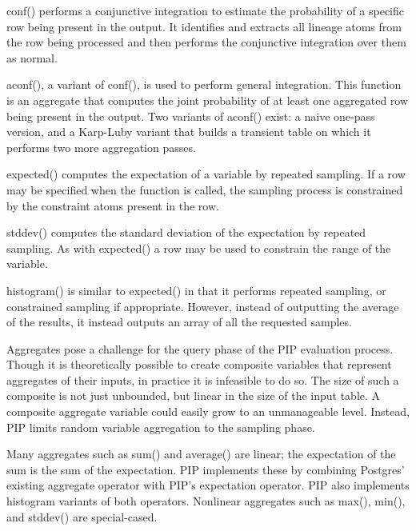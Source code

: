 conf() performs a conjunctive integration to estimate the probability of a specific row being present in the output.  It identifies and extracts all lineage atoms from the row being processed and then performs the conjunctive integration over them as normal.

aconf(), a variant of conf(), is used to perform general integration.  This function is an aggregate that computes the joint probability of at least one aggregated row being present in the output.  Two variants of aconf() exist: a naive one-pass version, and a Karp-Luby variant that builds a transient table on which it performs two more aggregation passes.

expected() computes the expectation of a variable by repeated sampling.  If a row may be specified when the function is called, the sampling process is constrained by the constraint atoms present in the row.

stddev() computes the standard deviation of the expectation by repeated sampling.  As with expected() a row may be used to constrain the range of the variable.

histogram() is similar to expected() in that it performs repeated sampling, or constrained sampling if appropriate.  However, instead of outputting the average of the results, it instead outputs an array of all the requested samples.

Aggregates pose a challenge for the query phase of the PIP evaluation process.  Though it is theoretically possible to create composite variables that represent aggregates of their inputs, in practice it is infeasible to do so.  The size of such a composite is not just unbounded, but linear in the size of the input table.  A composite aggregate variable could easily grow to an unmanageable level.  Instead, PIP limits random variable aggregation to the sampling phase.  

Many aggregates such as sum() and average() are linear; the expectation of the sum is the sum of the expectation.  PIP implements these by combining Postgres' existing aggregate operator with PIP's expectation operator.  PIP also implements histogram variants of both operators.  Nonlinear aggregates such as max(), min(), and stddev() are special-cased.  


